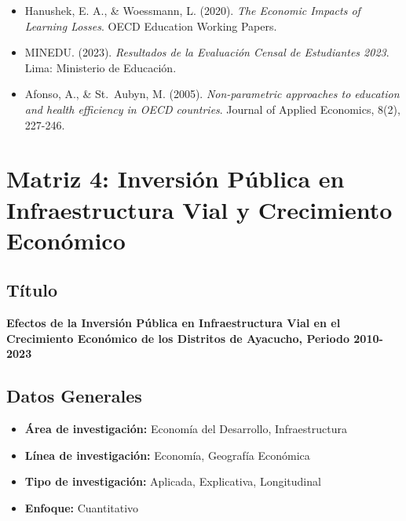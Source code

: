 \documentclass[
  man,
  floatsintext,
  longtable,
  a4paper,
  nolmodern,
  notxfonts,
  notimes,
  12pt,
  colorlinks=true,linkcolor=blue,citecolor=blue,urlcolor=blue]{apa7}
\providecommand{\tightlist}{%
  \setlength{\itemsep}{0pt}\setlength{\parskip}{0pt}}
\begin{document}
\begin{itemize}
\tightlist
\item
  Hanushek, E. A., \& Woessmann, L. (2020). \emph{The Economic Impacts
  of Learning Losses}. OECD Education Working Papers.
\item
  MINEDU. (2023). \emph{Resultados de la Evaluación Censal de
  Estudiantes 2023}. Lima: Ministerio de Educación.
\item
  Afonso, A., \& St.~Aubyn, M. (2005). \emph{Non-parametric approaches
  to education and health efficiency in OECD countries}. Journal of
  Applied Economics, 8(2), 227-246.
\end{itemize}

\section{Matriz 4: Inversión Pública en Infraestructura Vial y
Crecimiento
Económico}\label{matriz-4-inversiuxf3n-puxfablica-en-infraestructura-vial-y-crecimiento-econuxf3mico}

\subsection{Título}\label{tuxedtulo-3}

\textbf{Efectos de la Inversión Pública en Infraestructura Vial en el
Crecimiento Económico de los Distritos de Ayacucho, Periodo 2010-2023}

\subsection{Datos Generales}\label{datos-generales-3}

\begin{itemize}
\tightlist
\item
  \textbf{Área de investigación:} Economía del Desarrollo,
  Infraestructura
\item
  \textbf{Línea de investigación:} Economía, Geografía Económica
\item
  \textbf{Tipo de investigación:} Aplicada, Explicativa, Longitudinal
\item
  \textbf{Enfoque:} Cuantitativo
\end{itemize}
\end{document}
